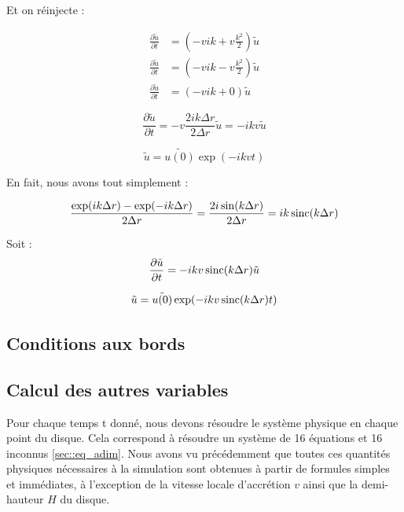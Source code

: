 Et on réinjecte :

\begin{subequations}
    \begin{align}
        \frac{\partial \tilde{u}}{\partial t} &= \left(- vik + v\frac{k^2}{2}\right) \tilde{u}\\
        \frac{\partial \tilde{u}}{\partial t} &= \left(- vik - v\frac{k^2}{2}\right) \tilde{u}\\
        \frac{\partial \tilde{u}}{\partial t} &= \left(- vik + 0             \right) \tilde{u}
    \end{align}
\end{subequations}

\begin{equation}
    \frac{\partial \tilde{u}}{\partial t} = - v \frac{2ik\Delta{r}}{2\Delta{r}} \tilde{u} = - i k v \tilde{u}
\end{equation}

\begin{equation}
    \tilde{u} = \tilde{u(0)} \exp(-i k v t)
\end{equation}

En fait, nous avons tout simplement :

\begin{equation}
    \frac{\exp(ik\Delta{r}) - \exp(-ik\Delta{r})}{2 \Delta{r}} = \frac{2 i \sin(k\Delta{r})}{2 \Delta{r}} = i k \operatorname{sinc}(k\Delta{r})
\end{equation}

Soit :
\begin{equation}
    \frac{\partial \tilde{u}}{\partial t} = - i k v \operatorname{sinc}(k\Delta{r}) \tilde{u}
\end{equation}

\begin{equation}
    \tilde{u} = \tilde{u(0)} \exp(-i k v \operatorname{sinc}(k \Delta{r}) t)
\end{equation}

\subsection{Conditions aux bords}

\subsection{Calcul des autres variables}

Pour chaque temps t donné, nous devons résoudre le système physique en chaque
point du disque. Cela correspond à résoudre un système de 16 équations et 16
inconnus \ref{sec::eq_adim}. Nous avons vu précédemment que toutes ces
quantités physiques nécessaires à  la simulation sont obtenues à  partir de
formules simples et immédiates, à  l'exception de la vitesse locale d'accrétion
$v$ ainsi que la demi-hauteur $H$ du disque.

